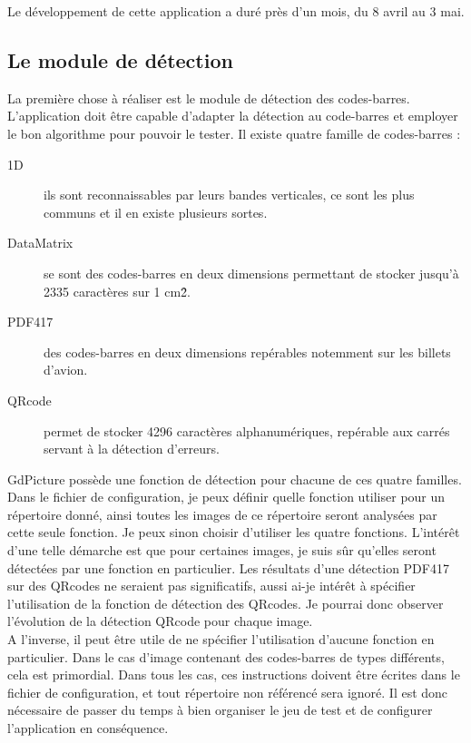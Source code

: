 Le développement de cette application a duré près d'un mois, du 8 avril au 3 mai.

\subsection{Le module de détection}

La première chose à réaliser est le module de détection des codes-barres. L'application doit être capable d'adapter la détection au code-barres et employer le bon algorithme pour pouvoir le tester.
Il existe quatre famille de codes-barres :

\begin{description}
 \item[1D] ils sont reconnaissables par leurs bandes verticales, ce sont les plus communs et il en existe plusieurs sortes.
 \item[DataMatrix] se sont des codes-barres en deux dimensions permettant de stocker jusqu'à 2335 caractères sur 1 cm\^{2}.
 \item[PDF417] des codes-barres en deux dimensions repérables notemment sur les billets d'avion.
 \item[QRcode] permet de stocker 4296 caractères alphanumériques, repérable aux carrés servant à la détection d'erreurs.
\end{description}

GdPicture possède une fonction de détection pour chacune de ces quatre familles. Dans le fichier de configuration, je peux définir quelle fonction utiliser pour un répertoire donné, ainsi toutes les images de ce répertoire seront analysées par cette seule fonction. Je peux sinon choisir d'utiliser les quatre fonctions. L'intérêt d'une telle démarche est que pour certaines images, je suis sûr qu'elles seront détectées par une fonction en particulier. Les résultats d'une détection PDF417 sur des QRcodes ne seraient pas significatifs, aussi ai-je intérêt à spécifier l'utilisation de la fonction de détection des QRcodes. Je pourrai donc observer l'évolution de la détection QRcode pour chaque image.\\
A l'inverse, il peut être utile de ne spécifier l'utilisation d'aucune fonction en particulier. Dans le cas d'image contenant des codes-barres de types différents, cela est primordial. Dans tous les cas, ces instructions doivent être écrites dans le fichier de configuration, et tout répertoire non référencé sera ignoré. Il est donc nécessaire de passer du temps à bien organiser le jeu de test et de configurer l'application en conséquence.

